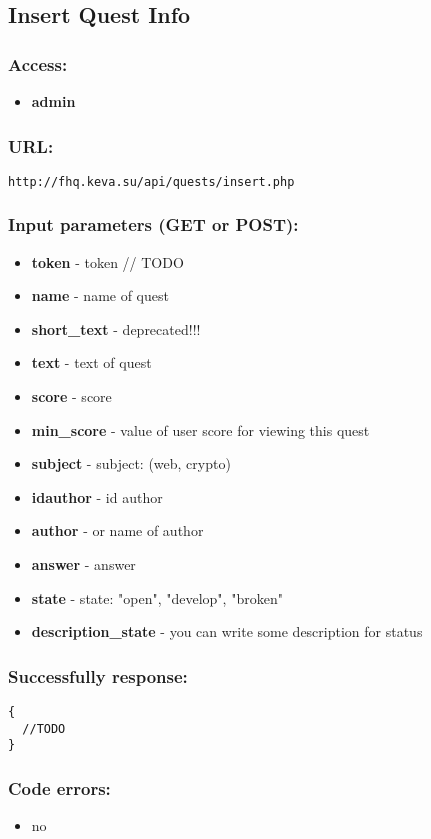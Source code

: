 \subsection{Insert Quest Info}
\par

\subsubsection{Access:}
\begin{itemize}
  \item \textbf{admin}
\end{itemize}

\subsubsection{URL:}
\begin{Verbatim}[frame=single]
http://fhq.keva.su/api/quests/insert.php
\end{Verbatim}

\subsubsection{Input parameters (GET or POST):}
\begin{itemize}
  \item \textbf{token} - token // TODO
  \item \textbf{name} - name of quest
  \item \textbf{short\_text} - deprecated!!!
  \item \textbf{text} - text of quest
  \item \textbf{score} - score
  \item \textbf{min\_score} - value of user score for viewing this quest
  \item \textbf{subject} - subject: (web, crypto)
  \item \textbf{idauthor} - id author 
  \item \textbf{author} - or name of author
  \item \textbf{answer} - answer
  \item \textbf{state} - state: "open", "develop", "broken"
  \item \textbf{description\_state} - you can write some description for status
\end{itemize}

\subsubsection{Successfully response:}
\begin{Verbatim}[frame=single]
{
  //TODO
}
\end{Verbatim}

\subsubsection{Code errors:}
\begin{itemize}
	\item no
\end{itemize}

